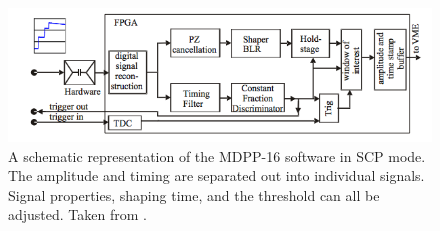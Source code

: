\begin{figure}[!t]
    \centering
    \includegraphics[scale=0.65]{Future_Figs/MDPP_Schematic.png}
    \caption{A schematic representation of the MDPP-16 software in SCP mode. The amplitude and timing are separated out into individual signals. Signal properties, shaping time, and the threshold can all be adjusted. Taken from \citep{mesytec:_mdpp}.}
    \label{fig:mdpp_schematic}
\end{figure}